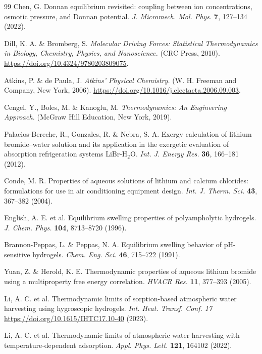 \documentclass[11pt]{article}
\begin{document}
\begin{thebibliography}{99}
 Chen, G. Donnan equilibrium revisited: coupling between ion concentrations, osmotic pressure, and Donnan potential. \textit{J. Micromech. Mol. Phys.} \textbf{7}, 127--134 (2022).

 Dill, K. A. \& Bromberg, S. \textit{Molecular Driving Forces: Statistical Thermodynamics in Biology, Chemistry, Physics, and Nanoscience.} (CRC Press, 2010). \url{https://doi.org/10.4324/9780203809075}.

 Atkins, P. \& de Paula, J. \textit{Atkins' Physical Chemistry.} (W. H. Freeman and Company, New York, 2006). \url{https://doi.org/10.1016/j.electacta.2006.09.003}.

 Cengel, Y., Boles, M. \& Kanoglu, M. \textit{Thermodynamics: An Engineering Approach.} (McGraw Hill Education, New York, 2019).

 Palacios-Bereche, R., Gonzales, R. \& Nebra, S. A. Exergy calculation of lithium bromide--water solution and its application in the exergetic evaluation of absorption refrigeration systems LiBr-H$_2$O. \textit{Int. J. Energy Res.} \textbf{36}, 166--181 (2012).

 Conde, M. R. Properties of aqueous solutions of lithium and calcium chlorides: formulations for use in air conditioning equipment design. \textit{Int. J. Therm. Sci.} \textbf{43}, 367--382 (2004).

 English, A. E. et al. Equilibrium swelling properties of polyampholytic hydrogels. \textit{J. Chem. Phys.} \textbf{104}, 8713--8720 (1996).

 Brannon-Peppas, L. \& Peppas, N. A. Equilibrium swelling behavior of pH-sensitive hydrogels. \textit{Chem. Eng. Sci.} \textbf{46}, 715--722 (1991).

 Yuan, Z. \& Herold, K. E. Thermodynamic properties of aqueous lithium bromide using a multiproperty free energy correlation. \textit{HVACR Res.} \textbf{11}, 377--393 (2005).

 Li, A. C. et al. Thermodynamic limits of sorption-based atmospheric water harvesting using hygroscopic hydrogels. \textit{Int. Heat. Transf. Conf. 17} \url{https://doi.org/10.1615/IHTC17.10-40} (2023).

 Li, A. C. et al. Thermodynamic limits of atmospheric water harvesting with temperature-dependent adsorption. \textit{Appl. Phys. Lett.} \textbf{121}, 164102 (2022).


\end{thebibliography}
\end{document}
